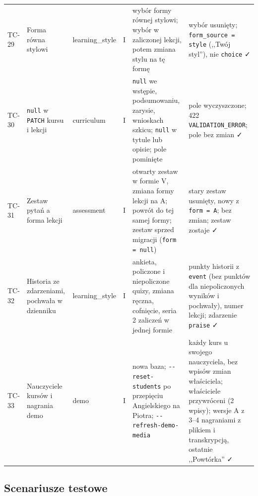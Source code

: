 \begin{longtable}{p{1cm} >{\raggedright\arraybackslash}p{3.2cm} >{\raggedright\arraybackslash}p{1.6cm} p{0.6cm} >{\raggedright\arraybackslash}p{4.3cm} >{\raggedright\arraybackslash}p{4.3cm}}
\addlinespace
TC-29 & Forma równa stylowi & learning\_style & I &
  wybór formy równej stylowi; wybór w zaliczonej lekcji, potem zmiana stylu na tę formę &
  wybór usunięty; \texttt{form\_source = style} (,,Twój styl''), nie \texttt{choice} \faCheck \\
\addlinespace
TC-30 & \texttt{null} w \texttt{PATCH} kursu i lekcji & curriculum & I &
  \texttt{null} we wstępie, podsumowaniu, zarysie, wnioskach szkicu; \texttt{null} w tytule lub opisie; pole pominięte &
  pole wyczyszczone; 422 \texttt{VALIDATION\_ERROR}; pole bez zmian \faCheck \\
\addlinespace
TC-31 & Zestaw pytań a forma lekcji & assessment & I &
  otwarty zestaw w formie V, zmiana formy lekcji na A; powrót do tej samej formy; zestaw sprzed migracji (\texttt{form = null}) &
  stary zestaw usunięty, nowy z \texttt{form = A}; bez zmian; zestaw zostaje \faCheck \\
\addlinespace
TC-32 & Historia ze zdarzeniami, pochwała w dzienniku & learning\_style & I &
  ankieta, policzone i niepoliczone quizy, zmiana ręczna, cofnięcie, seria 2 zaliczeń w jednej formie &
  punkty historii z \texttt{event} (bez punktów dla niepoliczonych wyników i pochwały), numer lekcji; zdarzenie \texttt{praise} \faCheck \\
\addlinespace
TC-33 & Nauczyciele kursów i nagrania demo & demo & I &
  nowa baza; \texttt{-{}-reset-students} po przepięciu Angielskiego na Piotra; \texttt{-{}-refresh-demo-media} &
  każdy kurs u swojego nauczyciela, bez wpisów zmian właściciela; właściciele przywróceni (2 wpisy); wersje A z 3--4 nagraniami z plikiem i transkrypcją, ostatnie ,,Powtórka'' \faCheck \\

\end{longtable}
\endgroup

\subsection{Scenariusze testowe}

